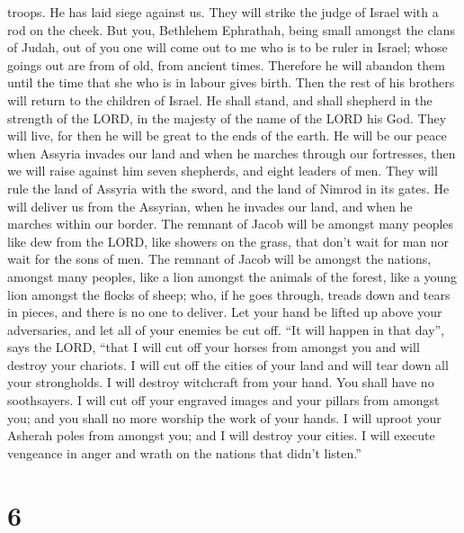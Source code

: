 troops. He has laid siege against us. They will strike the judge of
Israel with a rod on the cheek.  But you, Bethlehem
Ephrathah, being small amongst the clans of Judah, out of you one will
come out to me who is to be ruler in Israel; whose goings out are from
of old, from ancient times.  Therefore he will abandon them
until the time that she who is in labour gives birth. Then the rest of
his brothers will return to the children of Israel.  He
shall stand, and shall shepherd in the strength of the LORD, in the
majesty of the name of the LORD his God. They will live, for then he
will be great to the ends of the earth.  He will be our
peace when Assyria invades our land and when he marches through our
fortresses, then we will raise against him seven shepherds, and eight
leaders of men.  They will rule the land of Assyria with the
sword, and the land of Nimrod in its gates. He will deliver us from the
Assyrian, when he invades our land, and when he marches within our
border.  The remnant of Jacob will be amongst many peoples
like dew from the LORD, like showers on the grass, that don't wait for
man nor wait for the sons of men.  The remnant of Jacob will
be amongst the nations, amongst many peoples, like a lion amongst the
animals of the forest, like a young lion amongst the flocks of sheep;
who, if he goes through, treads down and tears in pieces, and there is
no one to deliver.  Let your hand be lifted up above your
adversaries, and let all of your enemies be cut off.  ``It
will happen in that day'', says the LORD, ``that I will cut off your
horses from amongst you and will destroy your chariots.  I
will cut off the cities of your land and will tear down all your
strongholds.  I will destroy witchcraft from your hand. You
shall have no soothsayers.  I will cut off your engraved
images and your pillars from amongst you; and you shall no more worship
the work of your hands.  I will uproot your Asherah poles
from amongst you; and I will destroy your cities.  I will
execute vengeance in anger and wrath on the nations that didn't
listen.''

\hypertarget{section-4}{%
\section{6}\label{section-4}}


